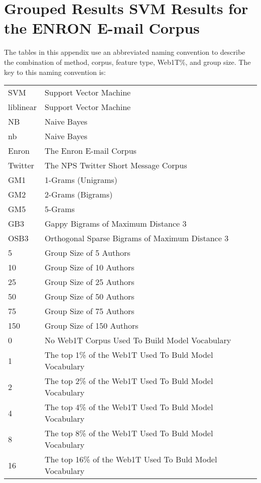 \chapter{Grouped Results SVM Results for the ENRON E-mail Corpus}

The tables in this appendix use an abbreviated naming convention to describe the combination of method, corpus, feature type, Web1T\%, and group size.  The key to this naming convention is:

\begin{center}
\begin{table}[htbp!]
	\begin{center}
	\begin{tabular}{ll}
	SVM & Support Vector Machine\\
	liblinear & Support Vector Machine\\
	NB & Naive Bayes\\
	nb & Naive Bayes\\
	
	Enron & The Enron E-mail Corpus\\
	Twitter & The NPS Twitter Short Message Corpus\\
	
	GM1 & 1-Grams (Unigrams)\\
	GM2 & 2-Grams (Bigrams)\\
	GM5 & 5-Grams\\
	GB3 & Gappy Bigrams of Maximum Distance 3\\
	OSB3 & Orthogonal Sparse Bigrams of Maximum Distance 3\\
		
	5 & Group Size of 5 Authors\\
	10 & Group Size of 10 Authors\\
	25 & Group Size of 25 Authors\\
	50 & Group Size of 50 Authors\\
	75 & Group Size of 75 Authors\\
	150 & Group Size of 150 Authors\\
	
	0 & No Web1T Corpus Used To Build Model Vocabulary\\
	1 & The top 1\% of the Web1T Used To Buld Model Vocabulary\\
	2 & The top 2\% of the Web1T Used To Buld Model Vocabulary\\
	4 & The top 4\% of the Web1T Used To Buld Model Vocabulary\\
	8 & The top 8\% of the Web1T Used To Buld Model Vocabulary\\
	16 & The top 16\% of the Web1T Used To Buld Model Vocabulary\\
	\end{tabular}
	\end{center}
\end{table}
\end{center}


